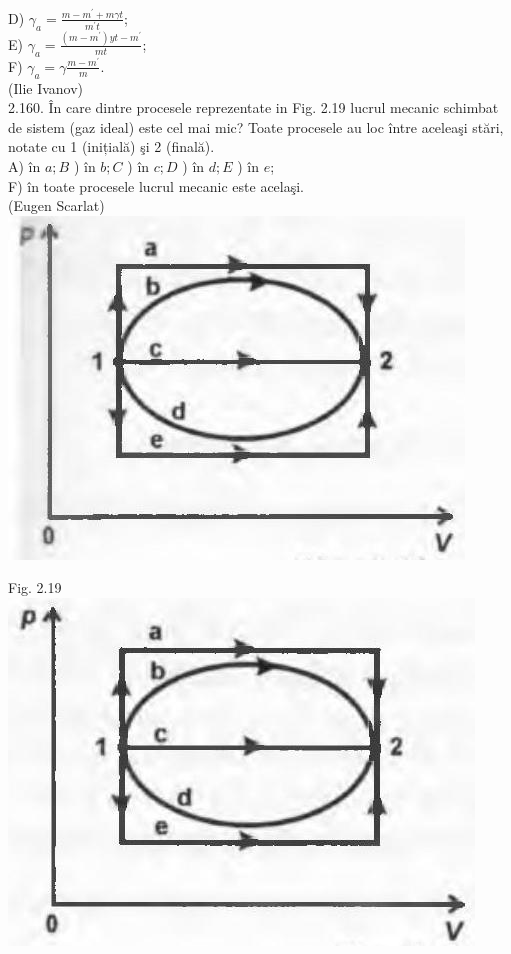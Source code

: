 \documentclass[10pt]{article}
\begin{document}
D) $\gamma_{a}=\frac{m-m^{\prime}+m \gamma t}{m^{\prime} t}$;\\
E) $\gamma_{a}=\frac{\left(m-m^{\prime}\right) y t-m^{\prime}}{m t}$;\\
F) $\gamma_{a}=\gamma \frac{m-m^{\prime}}{m}$.\\
(Ilie Ivanov)\\
2.160. În care dintre procesele reprezentate in Fig. 2.19 lucrul mecanic schimbat de sistem (gaz ideal) este cel mai mic? Toate procesele au loc între aceleaşi stări, notate cu 1 (inițială) şi 2 (finală).\\
A) în $a ; B$ ) în $b ; C$ ) în $c ; D$ ) în $d ; E$ ) în $e$;\\
F) în toate procesele lucrul mecanic este acelaşi.\\
(Eugen Scarlat)\\
\includegraphics[max width=\textwidth, center]{2025_07_01_5b3ff9fa0d508c8e9f17g-109(1)}

Fig. 2.19\\
\includegraphics[max width=\textwidth, center]{2025_07_01_5b3ff9fa0d508c8e9f17g-109}
\end{document}
